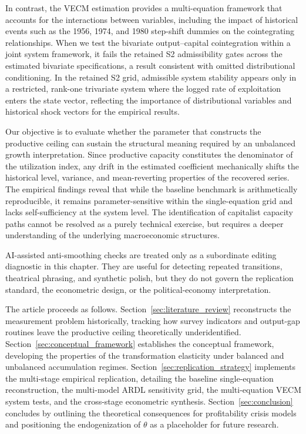 \documentclass[11pt]{article}
\begin{document}
In contrast, the VECM estimation provides a multi-equation framework that accounts for the interactions between variables, including the impact of historical events such as the 1956, 1974, and 1980 step-shift dummies on the cointegrating relationships. When we test the bivariate output--capital cointegration within a joint system framework, it fails the retained S2 admissibility gates across the estimated bivariate specifications, a result consistent with omitted distributional conditioning. In the retained S2 grid, admissible system stability appears only in a restricted, rank-one trivariate system where the logged rate of exploitation enters the state vector, reflecting the importance of distributional variables and historical shock vectors for the empirical results.

Our objective is to evaluate whether the parameter that constructs the productive ceiling can sustain the structural meaning required by an unbalanced growth interpretation. Since productive capacity constitutes the denominator of the utilization index, any drift in the estimated coefficient mechanically shifts the historical level, variance, and mean-reverting properties of the recovered series. The empirical findings reveal that while the baseline benchmark is arithmetically reproducible, it remains parameter-sensitive within the single-equation grid and lacks self-sufficiency at the system level. The identification of capitalist capacity paths cannot be resolved as a purely technical exercise, but requires a deeper understanding of the underlying macroeconomic structures.

AI-assisted anti-smoothing checks are treated only as a subordinate editing diagnostic in this chapter. They are useful for detecting repeated transitions, theatrical phrasing, and synthetic polish, but they do not govern the replication standard, the econometric design, or the political-economy interpretation.

The article proceeds as follows. Section~\ref{sec:literature_review} reconstructs the measurement problem historically, tracking how survey indicators and output-gap routines leave the productive ceiling theoretically underidentified. Section~\ref{sec:conceptual_framework} establishes the conceptual framework, developing the properties of the transformation elasticity under balanced and unbalanced accumulation regimes. Section~\ref{sec:replication_strategy} implements the multi-stage empirical replication, detailing the baseline single-equation reconstruction, the multi-model ARDL sensitivity grid, the multi-equation VECM system tests, and the cross-stage econometric synthesis. Section~\ref{sec:conclusion} concludes by outlining the theoretical consequences for profitability crisis models and positioning the endogenization of $\theta$ as a placeholder for future research.
\end{document}

